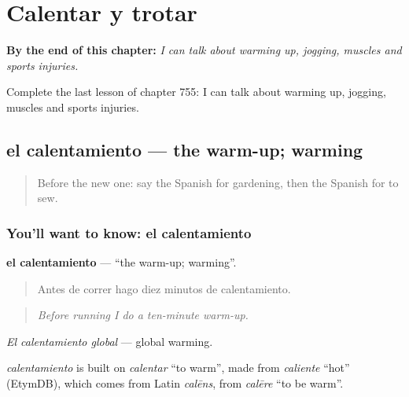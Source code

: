 
\chapter{Calentar y trotar}
\label{ch:es-calentar-y-trotar}

\begin{chapteropening}
\textbf{By the end of this chapter:} \emph{I can talk about warming up, jogging, muscles and sports injuries.}

Complete the last lesson of chapter 755: I can talk about warming up, jogging, muscles and sports injuries.
\end{chapteropening}

\section[el calentamiento]{el calentamiento — the warm-up; warming}

\label{lesson:ES-C755-calentamiento}



\begin{quote}
Before the new one: say the Spanish for gardening, then the Spanish for to sew.
\end{quote}

\subsection*{You'll want to know: el calentamiento}
\textbf{el calentamiento} — \textquotedblleft{}the warm-up; warming\textquotedblright{}.

\begin{quote}
Antes de correr hago diez minutos de calentamiento.
\end{quote}

\begin{quote}
\emph{Before running I do a ten-minute warm-up.}
\end{quote}

\emph{El calentamiento global} — global warming.

\begin{cousinweb}
\emph{calentamiento} is built on \emph{calentar} \textquotedblleft{}to warm\textquotedblright{}, made from \emph{caliente} \textquotedblleft{}hot\textquotedblright{} (EtymDB), which comes from Latin \emph{calēns}, from \emph{calēre} \textquotedblleft{}to be warm\textquotedblright{}.
\end{cousinweb}

